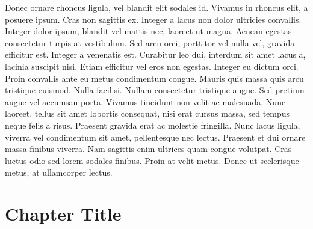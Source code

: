 \documentclass[a4paper]{memoir}
\begin{document}
Donec ornare rhoncus ligula, vel blandit elit sodales id. Vivamus in rhoncus elit, a posuere ipsum. Cras non sagittis ex. Integer a lacus non dolor ultricies convallis. Integer dolor ipsum, blandit vel mattis nec, laoreet ut magna. Aenean egestas consectetur turpis at vestibulum. Sed arcu orci, porttitor vel nulla vel, gravida efficitur est. Integer a venenatis est. Curabitur leo dui, interdum sit amet lacus a, lacinia suscipit nisi. Etiam efficitur vel eros non egestas. Integer eu dictum orci. Proin convallis ante eu metus condimentum congue. Mauris quis massa quis arcu tristique euismod. Nulla facilisi. Nullam consectetur tristique augue.
Sed pretium augue vel accumsan porta. Vivamus tincidunt non velit ac malesuada. Nunc laoreet, tellus sit amet lobortis consequat, nisi erat cursus massa, sed tempus neque felis a risus. Praesent gravida erat ac molestie fringilla. Nunc lacus ligula, viverra vel condimentum sit amet, pellentesque nec lectus. Praesent et dui ornare massa finibus viverra. Nam sagittis enim ultrices quam congue volutpat. Cras luctus odio sed lorem sodales finibus. Proin at velit metus. Donec ut scelerisque metus, at ullamcorper lectus. 

\chapter{Chapter Title}
\label{chaptertitle}
\end{document}
